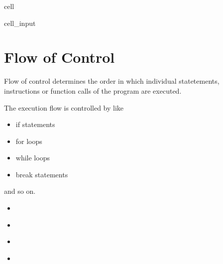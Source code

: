 \documentclass[a4paper,10pt,english]{jupyterBook}
\begin{document}
\begin{sphinxuseclass}{cell}\begin{sphinxVerbatimInput}

\begin{sphinxuseclass}{cell_input}
\begin{sphinxVerbatim}[commandchars=\\\{\}]
\end{sphinxVerbatim}

\end{sphinxuseclass}\end{sphinxVerbatimInput}

\end{sphinxuseclass}
\sphinxstepscope


\chapter{Flow of Control}
\label{\detokenize{text/progtut/controlflow:flow-of-control}}\label{\detokenize{text/progtut/controlflow::doc}}
\sphinxAtStartPar
Flow of control determines the order in which individual statetements, instructions or function calls of the program are executed.

\sphinxAtStartPar
The execution flow is controlled by  like
\begin{itemize}
\item {} 
\sphinxAtStartPar
if statements

\item {} 
\sphinxAtStartPar
for loops

\item {} 
\sphinxAtStartPar
while loops

\item {} 
\sphinxAtStartPar
break statements

\end{itemize}

\sphinxAtStartPar
and so on.
\begin{itemize}
\item {} 
\sphinxAtStartPar
{\hyperref[\detokenize{text/progtut/if::doc}]{}}

\item {} 
\sphinxAtStartPar
{\hyperref[\detokenize{text/progtut/while::doc}]{}}

\item {} 
\sphinxAtStartPar
{\hyperref[\detokenize{text/progtut/for::doc}]{}}

\item {} 
\sphinxAtStartPar
{\hyperref[\detokenize{text/progtut/pendulum::doc}]{}}

\end{itemize}
\end{document}
